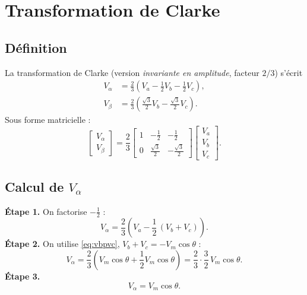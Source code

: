 \documentclass[11pt,a4paper]{article}
\numberwithin{equation}{section}
\theoremstyle{plain}
\theoremstyle{definition}
\theoremstyle{remark}
\begin{document}
\section{Transformation de Clarke}

\subsection{Définition}
La transformation de Clarke (version \emph{invariante en amplitude}, facteur $2/3$) s'écrit
\begin{align}
V_\alpha &= \frac23\left(V_a-\frac12V_b-\frac12V_c\right), \label{eq:clarke_a}\\
V_\beta  &= \frac23\left(\frac{\sqrt3}{2}V_b-\frac{\sqrt3}{2}V_c\right). \label{eq:clarke_b}
\end{align}
Sous forme matricielle :
\begin{equation}
\begin{bmatrix}V_\alpha\\V_\beta\end{bmatrix}
=\frac23\begin{bmatrix}1&-\tfrac12&-\tfrac12\\[2pt]0&\tfrac{\sqrt3}{2}&-\tfrac{\sqrt3}{2}\end{bmatrix}
\begin{bmatrix}V_a\\V_b\\V_c\end{bmatrix}.
\end{equation}

\subsection{Calcul de $V_\alpha$}
\textbf{Étape 1.} On factorise $-\frac12$ :
\begin{equation}
V_\alpha = \frac23\left(V_a-\frac12\,(V_b+V_c)\right).
\end{equation}
\textbf{Étape 2.} On utilise \eqref{eq:vbpvc}, $V_b+V_c=-V_m\cos\theta$ :
\begin{equation}
V_\alpha = \frac23\left(V_m\cos\theta+\frac12V_m\cos\theta\right) = \frac23\cdot\frac32\,V_m\cos\theta .
\end{equation}
\textbf{Étape 3.}
\begin{equation}\label{eq:valpha}
\boxed{V_\alpha = V_m\cos\theta.}
\end{equation}
\end{document}
